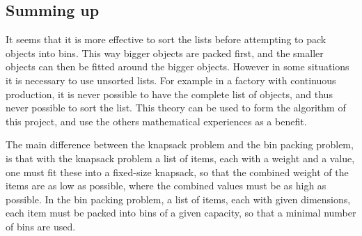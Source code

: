 \subsection{Summing up}
It seems that it is more effective to sort the lists before attempting to pack objects into bins. This way bigger objects are packed first, and the smaller objects can then be fitted around the bigger objects. However in some situations it is necessary to use unsorted lists. For example in a factory with continuous production, it is never possible to have the complete list of objects, and thus never possible to sort the list. This theory can be used to form the algorithm of this project, and use the others mathematical experiences as a benefit.


The main difference between the knapsack problem  and the bin packing problem, is that with the knapsack problem a list of items, each with a weight and a value, one must fit these into a fixed-size knapsack, so that the combined weight of the items are as low as possible, where the combined values must be as high as possible. In the bin packing problem, a list of items, each with given dimensions, each item must be packed into bins of a given capacity, so that a minimal number of bins are used.

